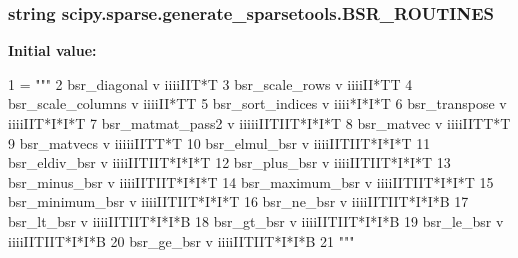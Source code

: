 \subsubsection[{B\+S\+R\+\_\+\+R\+O\+U\+T\+I\+N\+E\+S}]{\setlength{\rightskip}{0pt plus 5cm}string scipy.\+sparse.\+generate\+\_\+sparsetools.\+B\+S\+R\+\_\+\+R\+O\+U\+T\+I\+N\+E\+S}\label{namespacescipy_1_1sparse_1_1generate__sparsetools_a8d41c0c416f80d2304cf9e469ae6a9a7}
{\bfseries Initial value\+:}
\begin{DoxyCode}
1 = \textcolor{stringliteral}{"""}
2 \textcolor{stringliteral}{bsr\_diagonal        v iiiiIIT*T}
3 \textcolor{stringliteral}{bsr\_scale\_rows      v iiiiII*TT}
4 \textcolor{stringliteral}{bsr\_scale\_columns   v iiiiII*TT}
5 \textcolor{stringliteral}{bsr\_sort\_indices    v iiii*I*I*T}
6 \textcolor{stringliteral}{bsr\_transpose       v iiiiIIT*I*I*T}
7 \textcolor{stringliteral}{bsr\_matmat\_pass2    v iiiiiIITIIT*I*I*T}
8 \textcolor{stringliteral}{bsr\_matvec          v iiiiIITT*T}
9 \textcolor{stringliteral}{bsr\_matvecs         v iiiiiIITT*T}
10 \textcolor{stringliteral}{bsr\_elmul\_bsr       v iiiiIITIIT*I*I*T}
11 \textcolor{stringliteral}{bsr\_eldiv\_bsr       v iiiiIITIIT*I*I*T}
12 \textcolor{stringliteral}{bsr\_plus\_bsr        v iiiiIITIIT*I*I*T}
13 \textcolor{stringliteral}{bsr\_minus\_bsr       v iiiiIITIIT*I*I*T}
14 \textcolor{stringliteral}{bsr\_maximum\_bsr     v iiiiIITIIT*I*I*T}
15 \textcolor{stringliteral}{bsr\_minimum\_bsr     v iiiiIITIIT*I*I*T}
16 \textcolor{stringliteral}{bsr\_ne\_bsr          v iiiiIITIIT*I*I*B}
17 \textcolor{stringliteral}{bsr\_lt\_bsr          v iiiiIITIIT*I*I*B}
18 \textcolor{stringliteral}{bsr\_gt\_bsr          v iiiiIITIIT*I*I*B}
19 \textcolor{stringliteral}{bsr\_le\_bsr          v iiiiIITIIT*I*I*B}
20 \textcolor{stringliteral}{bsr\_ge\_bsr          v iiiiIITIIT*I*I*B}
21 \textcolor{stringliteral}{"""}
\end{DoxyCode}
\hypertarget{namespacescipy_1_1sparse_1_1generate__sparsetools_a6ef9fac0061967a7ca63ba16e6a7aa9e}{}

